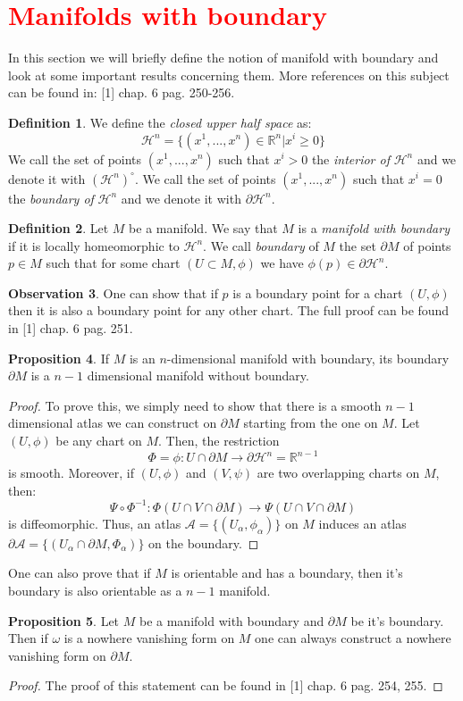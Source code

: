 \documentclass[12pt,a4paper]{report}
\theoremstyle{definition}
\newtheorem{Def}{Definition}[chapter]
\theoremstyle{Theorem}
\newtheorem{Prop}[Def]{Proposition}
\theoremstyle{definition}
\theoremstyle{definition}
\newtheorem{Obs}[Def]{Observation}
\begin{document}
	\section{\textcolor{red}{Manifolds with boundary}}
	In this section we will briefly define the notion of manifold with boundary and look at some important results concerning them. More references on this subject can be found in: [1] chap. 6 pag. 250-256.
	\begin{Def}
		We define the \textit{closed upper half space} as:
		$$\mathcal{H}^n=\{(x^1,...,x^n)\in\mathbb{R}^n|x^i\geq 0\}$$
		We call the set of points $(x^1,...,x^n)$ such that $x^i>0$ the \textit{interior of} $\mathcal{H}^n$ and we denote it with $(\mathcal{H}^n)^\circ$. We call the set of points $(x^1,...,x^n)$ such that $x^i=0$ the \textit{boundary of} $\mathcal{H}^n$ and we denote it with $\partial\mathcal{H}^n$.
	\end{Def}
	\begin{Def}
		Let $M$ be a manifold. We say that $M$ is a \textit{manifold with boundary} if it is locally homeomorphic to $\mathcal{H}^n$. We call \textit{boundary} of $M$ the set $\partial M$ of points $p\in M$ such that for some chart $(U\subset M, \phi)$ we have $\phi(p)\in\partial\mathcal{H}^n$.
	\end{Def}
	\begin{Obs}
		One can show that if $p$ is a boundary point for a chart $(U,\phi)$ then it is also a boundary point for any other chart. The full proof can be found in [1] chap. 6 pag. 251.
	\end{Obs}
	\begin{Prop}
		If $M$ is an $n$-dimensional manifold with boundary, its boundary $\partial M$ is a $n-1$ dimensional manifold without boundary.
	\end{Prop}
	\begin{proof}
		To prove this, we simply need to show that there is a smooth $n-1$ dimensional atlas we can construct on $\partial M$ starting from the one on $M$. Let $(U,\phi)$ be any chart on $M$. Then, the restriction
		$$\Phi=\phi:U\cap \partial M\rightarrow \partial \mathcal{H}^n=\mathbb{R}^{n-1}$$
		is smooth. Moreover, if $(U,\phi)$ and $(V,\psi)$ are two overlapping charts on $M$, then:
		$$\Psi\circ \Phi^{-1}:\Phi(U\cap V\cap \partial M)\rightarrow \Psi(U\cap V\cap \partial M)$$ 
		is diffeomorphic. Thus, an atlas $\mathcal{A}=\{(U_\alpha,\phi_\alpha)\}$ on $M$ induces an atlas $\mathcal{\partial A}=\{(U_\alpha\cap\partial M,\Phi_\alpha)\}$ on the boundary.
	\end{proof}
	One can also prove that if $M$ is orientable and has a boundary, then it's boundary is also orientable as a $n-1$ manifold.
	\begin{Prop}
		Let $M$ be a manifold with boundary and $\partial M$ be it's boundary. Then if $\omega$ is a nowhere vanishing form on $M$ one can always construct a nowhere vanishing form on $\partial M$.
	\end{Prop}
	\begin{proof}
		The proof of this statement can be found in [1] chap. 6 pag. 254, 255.
	\end{proof}
\end{document}
